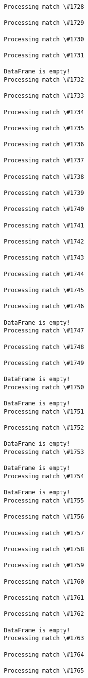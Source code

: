\documentclass[11pt]{article}
\begin{document}
\begin{Verbatim}[commandchars=\\\{\}]
Processing match \#1728

Processing match \#1729

Processing match \#1730

Processing match \#1731

DataFrame is empty!
Processing match \#1732

Processing match \#1733

Processing match \#1734

Processing match \#1735

Processing match \#1736

Processing match \#1737

Processing match \#1738

Processing match \#1739

Processing match \#1740

Processing match \#1741

Processing match \#1742

Processing match \#1743

Processing match \#1744

Processing match \#1745

Processing match \#1746

DataFrame is empty!
Processing match \#1747

Processing match \#1748

Processing match \#1749

DataFrame is empty!
Processing match \#1750

DataFrame is empty!
Processing match \#1751

Processing match \#1752

DataFrame is empty!
Processing match \#1753

DataFrame is empty!
Processing match \#1754

DataFrame is empty!
Processing match \#1755

Processing match \#1756

Processing match \#1757

Processing match \#1758

Processing match \#1759

Processing match \#1760

Processing match \#1761

Processing match \#1762

DataFrame is empty!
Processing match \#1763

Processing match \#1764

Processing match \#1765


\end{Verbatim}
\end{document}
